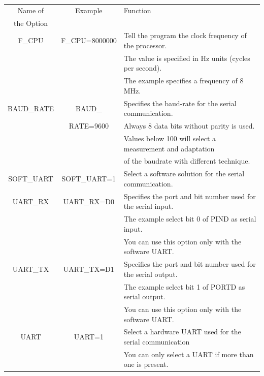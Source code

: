 \begin{table}[H]
  \begin{center}
    \begin{tabular}{| c | c | l |}
    \hline
   Name of        & Example         & Function                                            \\
   the Option         &                &                                                     \\
    \hline
    \hline
    F\_CPU         & F\_CPU=8000000 & Tell the program the clock frequency of the processor. \\
                   &                & The value is specified in Hz units (cycles per second). \\
                   &                & The example specifies a frequency of 8 MHz. \\
    \hline
    BAUD\_RATE     & BAUD\_         & Specifies the baud-rate for the serial communication. \\
                   &  RATE=9600     & Always 8 data bits without parity is used. \\
                   &                & Values below 100 will select a measurement and adaptation \\
                   &                & of the baudrate with different technique. \\
    \hline
    SOFT\_UART     & SOFT\_UART=1   & Select a software solution for the serial communication. \\
    \hline
    UART\_RX        & UART\_RX=D0   & Specifies the port and bit number used for the serial input. \\
                   &                & The example select bit 0 of PIND as serial input. \\
                   &                & You can use this option only with the software UART. \\
    \hline
    UART\_TX        & UART\_TX=D1   & Specifies the port and bit number used for the serial output. \\
                   &                & The example select bit 1 of PORTD as serial output. \\
                   &                & You can use this option only with the software UART. \\
    \hline
    UART           & UART=1         & Select a hardware UART used for the serial communication \\
                   &                & You can only select a UART if more than one is present. \\

\end{tabular}
\end{center}
\end{table}
